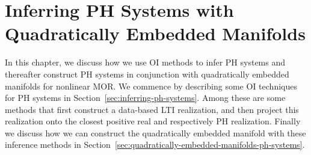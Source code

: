 \chapter[Inferring \texorpdfstring{\ac{PH} Systems with Quadratically Embedded Manifolds}{PH}]{%
    Inferring \texorpdfstring{\acl{PH}}{Port-Hamiltonian} Systems with \\
    Quadratically Embedded Manifolds
}\label{chap:inferring-models}

In this chapter, we discuss how we use \ac{OI} methods to infer \ac{PH} systems and thereafter construct \ac{PH} systems in conjunction with quadratically embedded manifolds for nonlinear \ac{MOR}.
We commence by describing some \ac{OI} techniques for \ac{PH} systems in Section~\ref{sec:inferring-ph-systems}.
Among these are some methods that first construct a data-based \ac{LTI} realization, and then project this realization onto the closest positive real and respectively \ac{PH} realization.
Finally we discuss how we can construct the quadratically embedded manifold with these inference methods in Section~\ref{sec:quadratically-embedded-manifolds-ph-systems}.



